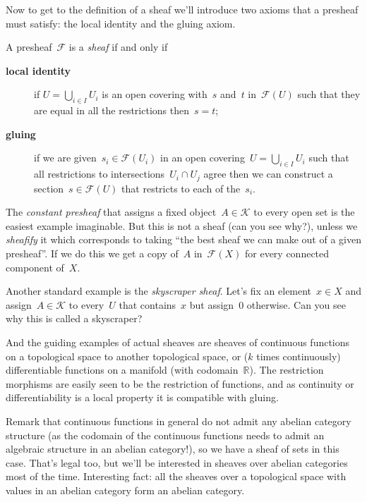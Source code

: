Now to get to the definition of a sheaf we'll introduce two axioms that a presheaf must satisfy: the local identity and the gluing axiom.

\begin{definition}
  A presheaf~$\mathcal{F}$ is a \emph{sheaf} if and only if
  \begin{description}
    \item[\textbf{local identity}] if $U=\bigcup_{i\in I}U_i$ is an open covering with~$s$ and~$t$ in~$\mathcal{F}(U)$ such that they are equal in all the restrictions then~$s=t$;
    \item[\textbf{gluing}] if we are given~$s_i\in\mathcal{F}(U_i)$ in an open covering~$U=\bigcup_{i\in I}U_i$ such that all restrictions to intersections~$U_i\cap U_j$ agree then we can construct a section~$s\in\mathcal{F}(U)$ that restricts to each of the~$s_i$.
  \end{description}
\end{definition}

\begin{example}
  The \emph{constant presheaf} that assigns a fixed object~$A\in\mathcal{K}$ to every open set is the easiest example imaginable. But this is not a sheaf (can you see why?), unless we \emph{sheafify} it which corresponds to taking ``the best sheaf we can make out of a given presheaf''. If we do this we get a copy of~$A$ in~$\mathcal{F}(X)$ for every connected component of~$X$.
\end{example}

\begin{example}
  Another standard example is the \emph{skyscraper sheaf}. Let's fix an element~$x\in X$ and assign~$A\in\mathcal{K}$ to every~$U$ that contains~$x$ but assign~$0$ otherwise. Can you see why this is called a skyscraper?
\end{example}

\begin{example}
  And the guiding examples of actual sheaves are sheaves of continuous functions on a topological space to another topological space, or ($k$ times continuously) differentiable functions on a manifold (with codomain~$\mathbb{R}$). The restriction morphisms are easily seen to be the restriction of functions, and as continuity or differentiability is a local property it is compatible with gluing.
  
  Remark that continuous functions in general do not admit any abelian category structure (as the codomain of the continuous functions needs to admit an algebraic structure in an abelian category!), so we have a sheaf of sets in this case. That's legal too, but we'll be interested in sheaves over abelian categories most of the time. Interesting fact: all the sheaves over a topological space with values in an abelian category form an abelian category.
\end{example}

